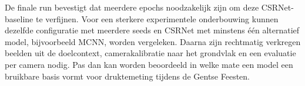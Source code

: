 De finale run bevestigt dat meerdere epochs noodzakelijk zijn om deze CSRNet-baseline te verfijnen. Voor een sterkere experimentele onderbouwing kunnen dezelfde configuratie met meerdere seeds en CSRNet met minstens één alternatief model, bijvoorbeeld MCNN, worden vergeleken. Daarna zijn rechtmatig verkregen beelden uit de doelcontext, camerakalibratie naar het grondvlak en een evaluatie per camera nodig. Pas dan kan worden beoordeeld in welke mate een model een bruikbare basis vormt voor druktemeting tijdens de Gentse Feesten.


